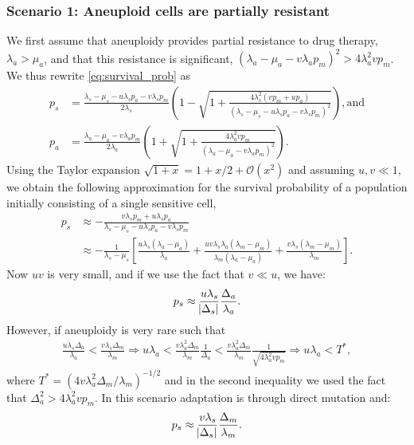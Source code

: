 \documentclass[12pt]{extarticle}
\begin{document}
\begin{appendices}
\subsubsection*{Scenario 1: Aneuploid cells are partially resistant} 

We first assume that aneuploidy provides partial resistance to drug therapy, $\lambda_a>\mu_a$, and that this resistance is significant, $\left(\lambda_a-\mu_a-v\lambda_ap_m\right)^2 > 4\lambda_a^2 v p_m$.
We thus rewrite \cref{eq:survival_prob} as
\begin{align*}
p_s&=\frac{\lambda_s-\mu_s-u\lambda_sp_a-v\lambda_sp_m}{2\lambda_s}\left(1-\sqrt{1+\frac{4\lambda_s^2\left(vp_m+up_a\right)}{\left(\lambda_s-\mu_s-u\lambda_sp_a-v\lambda_sp_m\right)^2}}\right) ,
\text{and} \\
p_a&=\frac{\lambda_a-\mu_a-v\lambda_ap_m}{2\lambda_a}\left(1+\sqrt{1+\frac{4\lambda_a^2vp_m}{\left(\lambda_a-\mu_a-v\lambda_ap_m\right)^2}}\right) . 
\end{align*}
Using the Taylor expansion $\sqrt{1+x}=1+x/2+\mathcal{O}(x^2)$ and assuming $u,v \ll 1$,
we obtain the following approximation for the survival probability of a population initially consisting of a single sensitive cell,
\begin{align} \label{eq:survprobwapprox1}
p_s
&\approx -\frac{v\lambda_sp_m+u\lambda_sp_a}{\lambda_s-\mu_s-u\lambda_sp_a-v\lambda_sp_m}\\
\nonumber
&\approx-\frac{1}{\lambda_s-\mu_s}\left[\frac{u\lambda_s\left(\lambda_a-\mu_a\right)}{\lambda_a}+\frac{uv\lambda_s\lambda_a\left(\lambda_m-\mu_m\right)}{\lambda_m\left(\lambda_a-\mu_a\right)}+\frac{v\lambda_s\left(\lambda_m-\mu_m\right)}{\lambda_m}\right].
\end{align}
Now $u v$ is very small, and if we use the fact that $v \ll u$, we have:
\begin{equation}\label{eq:pw_parttolerant}
p_s \approx \frac{u\lambda_s}{\abs{\Delta_s}}  \frac{\Delta_a}{\lambda_a} .
\end{equation}
However, if aneuploidy is very rare such that
\begin{align*}
\frac{u\lambda_s\Delta_a}{\lambda_a}<\frac{v\lambda_s\Delta_m}{\lambda_m}\Rightarrow u\lambda_a<\frac{v\lambda_a^2\Delta_m}{\lambda_m} \frac{1}{\Delta_a}<\frac{v\lambda_a^2\Delta_m}{\lambda_m} \frac{1}{\sqrt{4\lambda_a^2 v p_m}}\Rightarrow u\lambda_a<T^*,
\end{align*}
where $T^* = (4 v \lambda_a^2 \Delta_m/\lambda_m)^{-1/2}$ and in the second inequality we used the fact that $\Delta_a^2 > 4\lambda_a^2 v p_m$. In this scenario adaptation is through direct mutation and:
\begin{equation*}
p_s \approx \frac{v\lambda_s}{\abs{\Delta_s}}  \frac{\Delta_m}{\lambda_m} .
\end{equation*}

\end{appendices}
\end{document}
